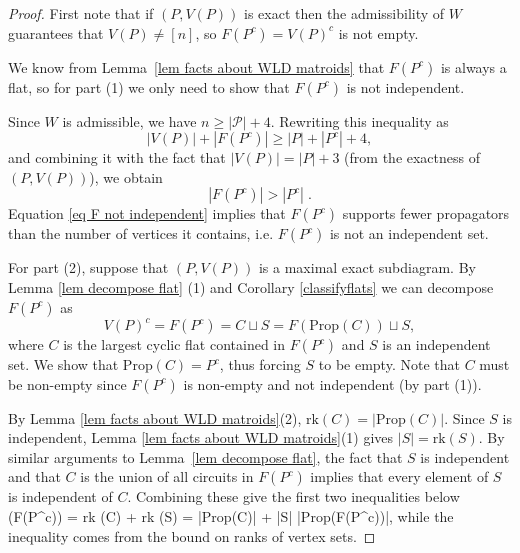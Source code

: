 \documentclass[11pt]{article}
\newcommand{\rk}{\textrm{rk} }
\def\ba #1\ea{\begin{align} #1 \end{align}}
\newcommand{\cP}{\mathcal{P}}
\newcommand{\Prop}{\textrm{Prop}}
\theoremstyle{remark}
\theoremstyle{definition}
\begin{document}
\begin{proof}

First note that if $(P,V(P))$ is exact then the admissibility of $W$ guarantees that $V(P) \neq [n]$, so $F(P^c) = V(P)^c$ is not empty. 

We know from Lemma~\ref{lem facts about WLD matroids} that $F(P^c)$ is always a flat, so for part (1) we only need to show that $F(P^c)$ is not independent.

Since $W$ is admissible, we have $n \geq |\cP| + 4$. Rewriting this inequality as
\[|V(P)| + |F(P^c)|  \geq  |P| + |P^c| +4,\]
and combining it with the fact that $|V(P)| = |P| + 3$ (from the exactness of $(P,V(P))$), we obtain
\begin{equation}\label{eq F not independent}|F(P^c)| > |P^c| \;.\end{equation}
Equation \eqref{eq F not independent} implies that $F(P^c)$ supports fewer propagators than the number of vertices it contains, i.e. $F(P^c)$ is not an independent set.

For part (2), suppose that $(P, V(P))$ is a maximal exact subdiagram. By Lemma \ref{lem decompose flat} (1) and Corollary \ref{classifyflats} we can decompose $F(P^c)$ as
\begin{equation}\label{eq decompose F}V(P)^c = F(P^c) = C \sqcup S = F(\Prop(C)) \sqcup S,\end{equation}
where $C$ is the largest cyclic flat contained in $F(P^c)$ and $S$ is an  independent set. We show that $\Prop(C) = P^c$, thus forcing $S$ to be empty. Note that $C$ must be non-empty since $F(P^c)$ is non-empty and not independent (by part (1)). 

By Lemma \ref{lem facts about WLD matroids}(2), $\rk(C) = |\Prop(C)|$. Since $S$ is independent, Lemma \ref{lem facts about WLD matroids}(1) gives $|S| = \rk(S)$. By similar arguments to Lemma~\ref{lem decompose flat}, the fact that $S$ is independent and that $C$ is the union of all circuits in $F(P^c)$ implies that every element of $S$ is independent of $C$. Combining these give the first two inequalities below
\ba \rk\big(F(P^c)\big) = \rk(C) + \rk(S)  = |\Prop(C)| + |S| \leq |\Prop(F(P^c))|\;,\label{rank of comp flat} \ea %
while the inequality comes from the bound on ranks of vertex sets. 


\end{proof}
\end{document}
